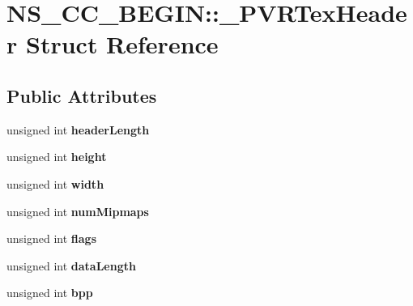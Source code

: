 \hypertarget{structNS__CC__BEGIN_1_1__PVRTexHeader}{}\section{N\+S\+\_\+\+C\+C\+\_\+\+B\+E\+G\+IN\+:\+:\+\_\+\+P\+V\+R\+Tex\+Header Struct Reference}
\label{structNS__CC__BEGIN_1_1__PVRTexHeader}
\subsection*{Public Attributes}
\begin{DoxyCompactItemize}
\item 
\mbox{\label{structNS__CC__BEGIN_1_1__PVRTexHeader_a9daaadbf79a085cbab98110a0a58ad79}} 
unsigned int {\bfseries header\+Length}
\item 
\mbox{\label{structNS__CC__BEGIN_1_1__PVRTexHeader_ab5e96189d432c2ee312f0cc0cfb294dc}} 
unsigned int {\bfseries height}
\item 
\mbox{\label{structNS__CC__BEGIN_1_1__PVRTexHeader_a5caab454ab608975421dd71b99c6c32c}} 
unsigned int {\bfseries width}
\item 
\mbox{\label{structNS__CC__BEGIN_1_1__PVRTexHeader_a1763a381f52d69e8cc803dfe95ed958c}} 
unsigned int {\bfseries num\+Mipmaps}
\item 
\mbox{\label{structNS__CC__BEGIN_1_1__PVRTexHeader_af015b3171f84a54c7afd83fd69e000c5}} 
unsigned int {\bfseries flags}
\item 
\mbox{\label{structNS__CC__BEGIN_1_1__PVRTexHeader_ae4114a52eec94cac598b5c39d9264a42}} 
unsigned int {\bfseries data\+Length}
\item 
\mbox{\label{structNS__CC__BEGIN_1_1__PVRTexHeader_aa0097d81b776754d36ab7220f3e89a2c}} 
unsigned int {\bfseries bpp}
\item 
\mbox{\label{structNS__CC__BEGIN_1_1__PVRTexHeader_ad7694bc71101bb4edd72a463acadc585}} 

\end{DoxyCompactItemize}
